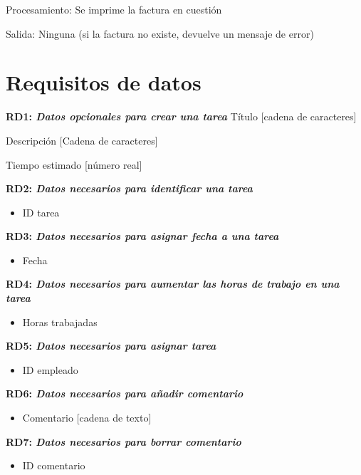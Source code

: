 \documentclass[paper=a4, fontsize=11pt, spanish]{scrartcl}
\begin{document}
	Procesamiento: Se imprime la factura en cuestión
	
	Salida: Ninguna (si la factura no existe, devuelve un mensaje de error)
	
	\section{Requisitos de datos}
	\setlength{\parindent}{0em}
	\textbf{RD1: \textit{Datos opcionales para crear una tarea}}
	\setlength{\parindent}{2em}
	Título [cadena de caracteres]
	
	Descripción [Cadena de caracteres]
	
	Tiempo estimado [número real]
	
	\setlength{\parindent}{0em}
	\textbf{RD2: \textit{Datos necesarios para identificar una tarea}}
	\setlength{\parindent}{2em}
	\begin{itemize}
		\item ID tarea
	\end{itemize}
	
	\setlength{\parindent}{0em}
	\textbf{RD3: \textit{Datos necesarios para asignar fecha a una tarea}}
	\setlength{\parindent}{2em}
	\begin{itemize}
		\item Fecha
	\end{itemize}
	
	\setlength{\parindent}{0em}
	\textbf{RD4: \textit{Datos necesarios para aumentar las horas de trabajo en una tarea}}
	\setlength{\parindent}{2em}
	\begin{itemize}
		\item Horas trabajadas
	\end{itemize}
	
	\setlength{\parindent}{0em}
	\textbf{RD5: \textit{Datos necesarios para asignar tarea}}
	\setlength{\parindent}{2em}
	\begin{itemize}
		\item ID empleado
	\end{itemize}
	
	\setlength{\parindent}{0em}
	\textbf{RD6: \textit{Datos necesarios para añadir comentario}}
	\setlength{\parindent}{2em}
	\begin{itemize}
		\item Comentario [cadena de texto]
	\end{itemize}
	
	\setlength{\parindent}{0em}
	\textbf{RD7: \textit{Datos necesarios para borrar comentario}}
	\setlength{\parindent}{2em}
	\begin{itemize}
		\item ID comentario
	\end{itemize}
	
\end{document}
